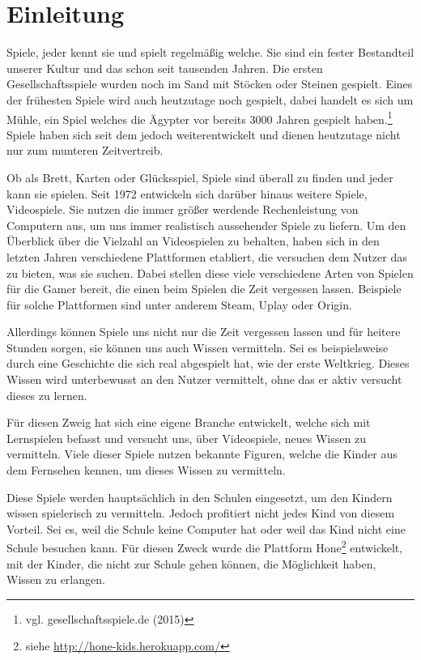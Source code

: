 \chapter{Einleitung}


Spiele, jeder kennt sie und spielt regelmäßig welche. Sie sind ein fester Bestandteil unserer Kultur und das schon seit tausenden Jahren. Die ersten Gesellschaftsspiele wurden noch im Sand mit Stöcken oder Steinen gespielt. Eines der frühesten Spiele wird auch heutzutage noch gespielt, dabei handelt es sich um Mühle, ein Spiel welches die Ägypter vor bereits 3000 Jahren gespielt haben.\footnote{vgl. gesellschaftsspiele.de \cite{spiele} (2015)} Spiele haben sich seit dem jedoch weiterentwickelt und dienen heutzutage nicht nur zum munteren Zeitvertreib. 

Ob als Brett, Karten oder Glücksspiel, Spiele sind überall zu finden und jeder kann sie spielen. Seit 1972 entwickeln sich darüber hinaus weitere Spiele, Videospiele. Sie nutzen die immer größer werdende Rechenleistung von Computern aus, um uns immer realistisch aussehender Spiele zu liefern. 
Um den Überblick über die Vielzahl an Videospielen zu behalten, haben sich in den letzten Jahren verschiedene Plattformen etabliert, die versuchen dem Nutzer das zu bieten, was sie suchen. Dabei stellen diese viele verschiedene Arten von Spielen für die Gamer bereit, die einen beim Spielen die Zeit vergessen lassen. Beispiele für solche Plattformen sind unter anderem Steam, Uplay oder Origin.

Allerdings können Spiele uns nicht nur die Zeit vergessen lassen und für heitere Stunden sorgen, sie können uns auch Wissen vermitteln. Sei es beispielsweise durch eine Geschichte die sich real abgespielt hat, wie der erste Weltkrieg. Dieses Wissen wird unterbewusst an den Nutzer vermittelt, ohne das er aktiv versucht dieses zu lernen.

Für diesen Zweig hat sich eine eigene Branche entwickelt, welche sich mit Lernspielen befasst und versucht uns, über Videospiele, neues Wissen zu vermitteln. Viele dieser Spiele nutzen bekannte Figuren, welche die Kinder aus dem Fernsehen kennen, um dieses Wissen zu vermitteln.

Diese Spiele werden hauptsächlich in den Schulen eingesetzt, um den Kindern wissen spielerisch zu vermitteln. Jedoch profitiert nicht jedes Kind von diesem Vorteil. Sei es, weil die Schule keine Computer hat oder weil das Kind nicht eine Schule besuchen kann. Für diesen Zweck wurde die Plattform Hone\footnote{siehe \url{http://hone-kids.herokuapp.com/}} entwickelt, mit der Kinder, die nicht zur Schule gehen können, die Möglichkeit haben, Wissen zu erlangen. 


